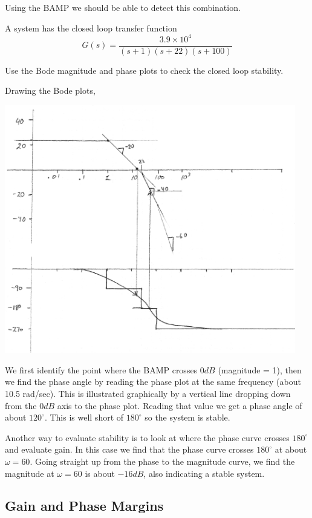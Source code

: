 Using the BAMP we should be able to detect this combination.

\begin{ExampleSmall}\label{bodestabilityexample}
A system has the closed loop transfer function
\[
G(s) = \frac {3.9\times 10^4} {(s+1)(s+22)(s+100)}
\]

Use the Bode magnitude and phase plots to check the closed loop stability.

Drawing the Bode plots,

\includegraphics[width=5.0in]{figs06/00794aa.png}

We first identify the point where the BAMP crosses 0$dB$ (magnitude = 1), then we find the phase angle by reading the phase plot at the same frequency (about 10.5 rad/sec).   This is illustrated graphically by a vertical line dropping down from the $0dB$ axis to the phase plot.  Reading that value we get a phase angle of about $120^\circ$.  This is well short of $180^\circ$ so the system is stable.

Another way to evaluate stability is to look at where the phase curve crosses $180^\circ$ and evaluate gain.  In this case we find that the phase curve crosses $180^\circ$ at about $\omega=60$.  Going straight up from the phase to the magnitude curve, we find the magnitude at $\omega = 60$ is about $-16dB$, also indicating a stable system.
\end{ExampleSmall}

\subsection{Gain and Phase Margins}\label{GainPhaseMargins}

